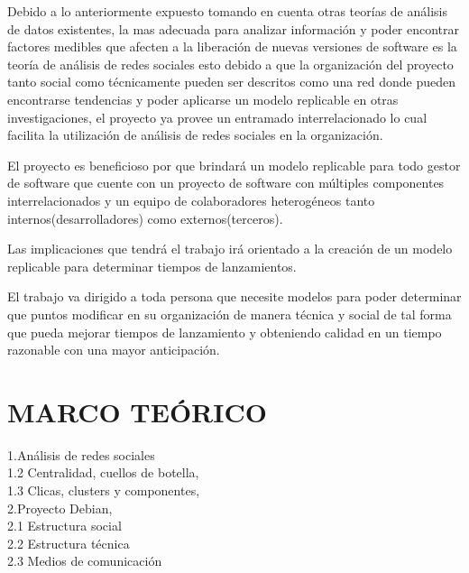 \documentclass[12pt]{report}               \usepackage[utf8]{inputenc}
\begin{document}
Debido a lo anteriormente expuesto  tomando en cuenta otras teorías de
análisis  de   datos  existentes,   la  mas  adecuada   para  analizar
información  y poder  encontrar  factores medibles  que  afecten a  la
liberación de nuevas versiones de software es la teoría de análisis de
redes sociales  esto debido a  que la organización del  proyecto tanto
social  como técnicamente  pueden  ser descritos  como  una red  donde
pueden encontrarse  tendencias y poder aplicarse  un modelo replicable
en  otras   investigaciones,  el  proyecto  ya   provee  un  entramado
interrelacionado lo cual facilita la  utilización de análisis de redes
sociales en la organización.

El proyecto es beneficioso por  que brindará un modelo replicable para
todo gestor  de software que  cuente con  un proyecto de  software con
múltiples componentes  interrelacionados y un equipo  de colaboradores
heterogéneos tanto internos(desarrolladores) como externos(terceros).

Las implicaciones que tendrá el trabajo irá orientado a la creación de
un modelo replicable para determinar tiempos de lanzamientos.

El trabajo va dirigido a toda  persona que necesite modelos para poder
determinar que puntos modificar en su organización de manera técnica y
social  de  tal forma  que  pueda  mejorar  tiempos de  lanzamiento  y
obteniendo calidad en un tiempo razonable con una mayor anticipación.

\chapter*{MARCO TEÓRICO}

1.Análisis de redes  sociales \\ 
1.2 Centralidad,  cuellos de botella,\\ 
1.3  Clicas, clusters y  componentes, \\ 
2.Proyecto Debian,  \\ 
2.1 Estructura  social  \\  
2.2  Estructura   técnica  \\  
2.3  Medios  de comunicación \\

\end{document}
